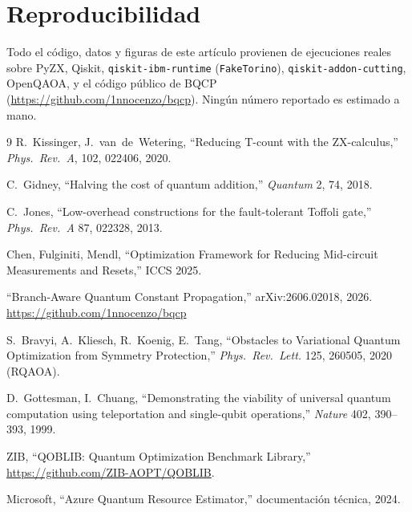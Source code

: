 \documentclass[9pt,twocolumn]{extarticle}
\begin{document}
\section*{Reproducibilidad}
Todo el código, datos y figuras de este artículo provienen de ejecuciones
reales sobre PyZX, Qiskit, \texttt{qiskit-ibm-runtime} (\texttt{FakeTorino}),
\texttt{qiskit-addon-cutting}, OpenQAOA, y el código público de BQCP
(\url{https://github.com/1nnocenzo/bqcp}). Ningún número reportado es
estimado a mano.

\begin{thebibliography}{9}
\footnotesize
{}
R.\ Kissinger, J.\ van~de~Wetering, ``Reducing T-count with the ZX-calculus,''
\emph{Phys.\ Rev.\ A}, 102, 022406, 2020.

C.\ Gidney, ``Halving the cost of quantum addition,''
\emph{Quantum} 2, 74, 2018.

C.\ Jones, ``Low-overhead constructions for the fault-tolerant Toffoli gate,''
\emph{Phys.\ Rev.\ A} 87, 022328, 2013.

Chen, Fulginiti, Mendl, ``Optimization Framework for Reducing Mid-circuit
Measurements and Resets,'' ICCS 2025.

``Branch-Aware Quantum Constant Propagation,'' arXiv:2606.02018, 2026.
\url{https://github.com/1nnocenzo/bqcp}

S.\ Bravyi, A.\ Kliesch, R.\ Koenig, E.\ Tang, ``Obstacles to Variational
Quantum Optimization from Symmetry Protection,'' \emph{Phys.\ Rev.\ Lett.}
125, 260505, 2020 (RQAOA).

D.\ Gottesman, I.\ Chuang, ``Demonstrating the viability of universal
quantum computation using teleportation and single-qubit operations,''
\emph{Nature} 402, 390--393, 1999.

ZIB, ``QOBLIB: Quantum Optimization Benchmark Library,''
\url{https://github.com/ZIB-AOPT/QOBLIB}.

Microsoft, ``Azure Quantum Resource Estimator,'' documentación técnica,
2024.
\end{thebibliography}
\end{document}
